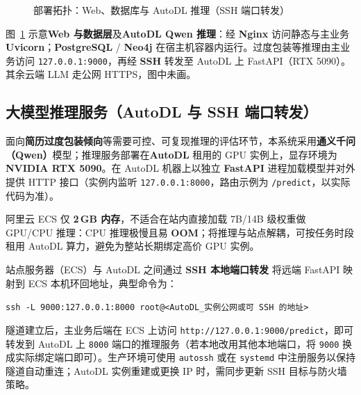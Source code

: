 \documentclass[12pt,a4paper]{ctexart}
\begin{document}
\begin{figure}[H]
{%
}
\caption{部署拓扑：Web、数据库与 AutoDL 推理（SSH 端口转发）}
\label{fig:deploy-topo}
\end{figure}

图~\ref{fig:deploy-topo} 示意\textbf{Web 与数据层}及\textbf{AutoDL Qwen 推理}：经 \textbf{Nginx} 访问静态与主业务 \textbf{Uvicorn}；\textbf{PostgreSQL} / \textbf{Neo4j} 在宿主机容器内运行。过度包装等推理由主业务访问 \texttt{127.0.0.1:9000}，再经 \textbf{SSH} 转发至 AutoDL 上 FastAPI（RTX 5090）。其余云端 LLM 走公网 HTTPS，图中未画。

\subsection{大模型推理服务（AutoDL 与 SSH 端口转发）}

面向\textbf{简历过度包装倾向}等需要可控、可复现推理的评估环节，本系统采用\textbf{通义千问（Qwen）}模型；推理服务部署在\textbf{AutoDL} 租用的 GPU 实例上，显存环境为 \textbf{NVIDIA RTX 5090}。在 AutoDL 机器上以独立 \textbf{FastAPI} 进程加载模型并对外提供 HTTP 接口（实例内监听 \texttt{127.0.0.1:8000}，路由示例为 \texttt{/predict}，以实际代码为准）。

阿里云 ECS 仅 \textbf{2\,GB 内存}，不适合在站内直接加载 7B/14B 级权重做 GPU/CPU 推理：CPU 推理极慢且易 \textbf{OOM}；将推理与站点解耦，可按任务时段租用 AutoDL 算力，避免为整站长期绑定高价 GPU 实例。

站点服务器（ECS）与 AutoDL 之间通过 \textbf{SSH 本地端口转发} 将远端 FastAPI 映射到 ECS 本机环回地址，典型命令为：

\begin{center}
\texttt{ssh -L 9000:127.0.0.1:8000 root@<AutoDL\_实例公网或可 SSH 的地址>}
\end{center}

隧道建立后，主业务后端在 ECS 上访问 \texttt{http://127.0.0.1:9000/predict}，即可转发到 AutoDL 上 \texttt{8000} 端口的推理服务（若本地改用其他本地端口，将 \texttt{9000} 换成实际绑定端口即可）。生产环境可使用 \texttt{autossh} 或在 \texttt{systemd} 中注册服务以保持隧道自动重连；AutoDL 实例重建或更换 IP 时，需同步更新 SSH 目标与防火墙策略。
\end{document}
